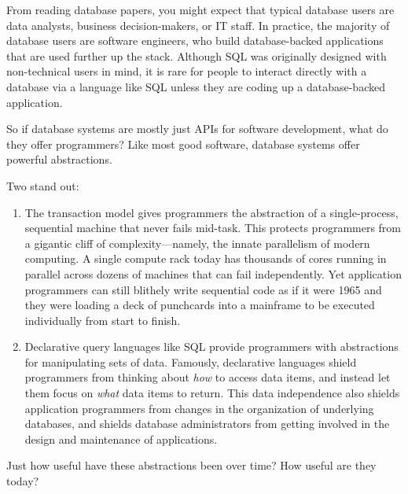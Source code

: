 \documentclass[b5paper,11pt,twoside,openright]{book}
\begin{document}
From reading database papers, you might expect that typical database
users are data analysts, business decision-makers, or IT staff. In
practice, the majority of database users are software engineers, who
build database-backed applications that are used further up the stack.
Although SQL was originally designed with non-technical users in mind,
it is rare for people to interact directly with a database via a
language like SQL unless they are coding up a database-backed
application.

So if database systems are mostly just APIs for software development,
what do they offer programmers? Like most good software, database
systems offer powerful abstractions.

\enlargethispage{-2\baselineskip}
Two stand out:

\begin{enumerate}
  \item
  The transaction model gives programmers the abstraction of a
  single-process, sequential machine that never fails mid-task. This
  protects programmers from a gigantic cliff of complexity---namely, the
  innate parallelism of modern computing. A single compute rack today
  has thousands of cores running in parallel across dozens of machines
  that can fail independently. Yet application programmers can still
  blithely write sequential code as if it were 1965 and they were
  loading a deck of punchcards into a mainframe to be executed
  individually from start to finish.
  \item
  Declarative query languages like SQL provide programmers with
  abstractions for manipulating sets of data. Famously, declarative
  languages shield programmers from thinking about \emph{how} to access
  data items, and instead let them focus on \emph{what} data items to
  return. This data independence also shields application programmers
  from changes in the organization of underlying databases, and shields
  database administrators from getting involved in the design and
  maintenance of applications.
\end{enumerate}

Just how useful have these abstractions been over time? How useful are
they today?
\end{document}
